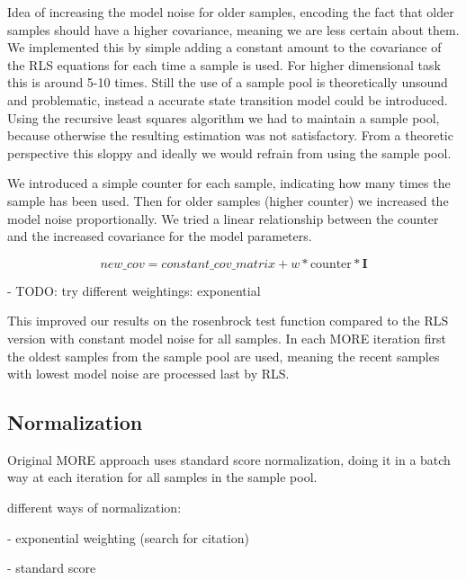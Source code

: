 Idea of increasing the model noise for older samples, encoding the fact that
older samples should have a higher covariance, meaning we are less
certain about them. We implemented this by simple adding a constant
amount to the covariance of the RLS equations for each time a sample is
used. For higher dimensional task this is around 5-10 times.
Still the use of a sample pool is theoretically unsound and problematic,
instead a accurate state transition model could be introduced.
Using the recursive least squares algorithm we had to maintain a sample
pool, because otherwise the resulting estimation was not
satisfactory. From a theoretic perspective this sloppy and ideally we
would refrain from using the sample pool.

We introduced a simple counter for each sample, indicating how many times
the sample has been used.
Then for older samples (higher counter) we increased the model
noise proportionally.
We tried a linear relationship between the counter and
the increased covariance for the model parameters.

$$ new\_cov = constant\_cov\_matrix + w * \text{counter} * \mathbf{I} $$

- TODO: try different weightings: exponential

This improved our results on the rosenbrock test function compared
to the RLS version with constant model noise for all samples.
In each MORE iteration first the oldest samples from the sample pool
are used, meaning the recent samples with lowest model noise are
processed last by RLS.


\subsection{Normalization}
Original MORE approach uses standard score normalization, doing it
in a batch way at each iteration for all samples in the sample pool.

different ways of normalization:

- exponential weighting (search for citation)

- standard score

